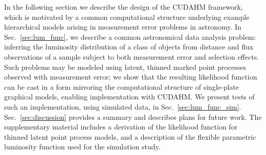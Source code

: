 
In the following section we describe the design of the CUDAHM framework, which is motivated by a common computational structure underlying example hierarchical models arising in measurement error problems in astronomy. 
In Sec.~\ref{sec:lum_func}, we describe a common astronomical data analysis problem: inferring the luminosity distribution of a class of objects from distance and flux observations of a sample subject to both measurement error and selection effects.
Such problems may be modeled using latent, thinned marked point processes observed with measurement error; we show that the resulting likelihood function can be cast in a form mirroring the computational structure of single-plate graphical models, enabling implementation with CUDAHM.
We present tests of such an implementation, using simulated data, in Sec.~\ref{sec:lum_func_sim}.
Sec.~\ref{sec:discussion} provides a summary and describes plans for future work.
The supplementary material includes a derivation of the likelihood function for thinned latent point process models, and a description of the flexible parametric luminosity function used for the simulation study.
